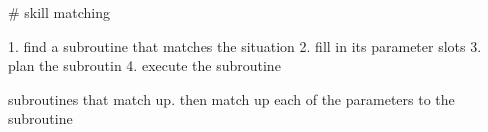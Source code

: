 \# skill matching

1. find a subroutine that matches the situation
2. fill in its parameter slots
3. plan the subroutin
4. execute the subroutine

subroutines that match up. then match up each of the parameters to the subroutine
